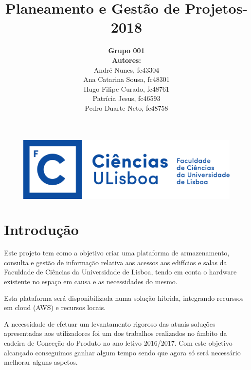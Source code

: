 \documentclass[a4paper]{report}
\begin{document}
\title{\textbf{Planeamento e Gestão de Projetos}\linebreak {}-2018\linebreak {}}
\date{}
\author{
	\textbf{Grupo 001}\\
	\textbf{Autores:}\\
	André Nunes, fc43304\\
	Ana Catarina Sousa, fc48301\\ 
	Hugo Filipe Curado, fc48761\\ 
	Patrícia Jesus, fc46593\\
	Pedro Duarte Neto, fc48758
}
\begin{figure}
	\begin{center}
		\includegraphics[scale=.2]{images/LogoFCUL.png}
	\end{center}
\end{figure}
\maketitle
\tableofcontents
\chapter{Introdução}
Este projeto tem como a objetivo criar uma plataforma de armazenamento, consulta e gestão de informação relativa aos acessos aos edifícios e salas da Faculdade de Ciências da Universidade de Lisboa, tendo em conta o hardware existente no espaço em causa e as necessidades do mesmo.

Esta plataforma será disponibilizada numa solução hibrida, integrando recurssos em cloud (AWS) e recursos locais.

A necessidade de efetuar um levantamento rigoroso das atuais soluções apresentadas aos utilizadores foi um dos trabalhos realizados no âmbito da cadeira de Conceção do Produto no ano letivo 2016/2017. Com este objetivo alcançado conseguimos ganhar algum tempo sendo que agora só será necessário melhorar alguns aspetos.
\end{document}
